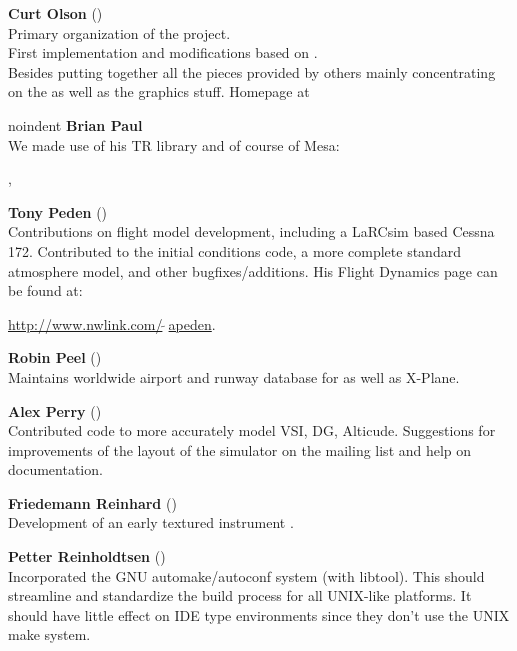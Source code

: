 \noindent \textbf{Curt Olson} ()\\
 Primary organization of the project.\\
 First implementation and modifications based on .\\
 Besides putting together all the pieces provided by others mainly concentrating on the  as well as the graphics stuff. Homepage at

 \medskip
 
 noindent \textbf{Brian Paul}\\
 We made use of his TR library and of course of Mesa:
 
 , 
 \medskip

\noindent \textbf{Tony Peden}  ()\\
  Contributions on flight model development, including a LaRCsim based
  Cessna 172. Contributed to  {\JSBSim} the initial conditions code, a more complete
  standard atmosphere model, and other bugfixes/additions.
  His Flight Dynamics page can be found at:
   \medskip

  \href{http://www.nwlink.com/~apeden}{http://www.nwlink.com/$\tilde{~~}$apeden}.
  \medskip


\noindent \textbf{Robin Peel} ()\\
  Maintains worldwide airport and runway database for \FlightGear{} as well as X-Plane.
 \medskip

\noindent \textbf{Alex Perry} ()\\
 Contributed code to more accurately model VSI, DG, Alticude.
 Suggestions for improvements of the layout of the simulator on the mailing list
 and help on documentation.
 \medskip

\noindent \textbf{Friedemann Reinhard}
()\\
  Development of an early textured instrument .
 \medskip

\noindent \textbf{Petter Reinholdtsen}
()\\
  Incorporated the GNU automake/autoconf system (with libtool).
  This should streamline and standardize the build process for all
  UNIX-like platforms.  It should have little effect on IDE type
  environments since they don't use the UNIX make system.
 \medskip

